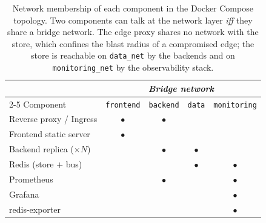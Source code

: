 \documentclass{scrartcl}
\begin{document}
\begin{table}
      \centering
      \caption{Network membership of each component in the Docker Compose topology.
            Two components can talk at the network layer \emph{iff} they share a bridge
            network. The edge proxy shares no network with the store, which confines the
            blast radius of a compromised edge; the store is reachable on
            \texttt{data\_net} by the backends and on \texttt{monitoring\_net} by the
            observability stack.}
      \label{tab:networks}
      \begin{tabular}{lcccc}
            \toprule
                                         & \multicolumn{4}{c}{\emph{Bridge network}}                                                \\
            \cmidrule(l){2-5}
            Component
                                         & \texttt{frontend}                         & \texttt{backend} & \texttt{data}
                                         & \texttt{monitoring}                                                                      \\
            \midrule
            Reverse proxy / Ingress      & $\bullet$                                 & $\bullet$        &               &           \\
            Frontend static server       & $\bullet$                                 &                  &               &           \\
            Backend replica ($\times N$) &                                           & $\bullet$        & $\bullet$     &           \\
            Redis (store $+$ bus)        &                                           &                  & $\bullet$     & $\bullet$ \\
            Prometheus                   &                                           & $\bullet$        &               & $\bullet$ \\
            Grafana                      &                                           &                  &               & $\bullet$ \\
            redis-exporter               &                                           &                  &               & $\bullet$ \\
            \bottomrule
      \end{tabular}
\end{table}
\end{document}
